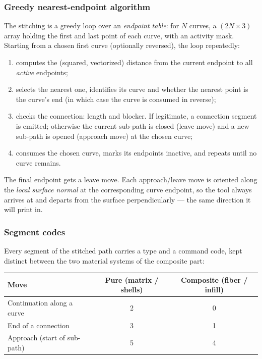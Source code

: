 \subsubsection{Greedy nearest-endpoint algorithm}

The stitching is a greedy loop over an \emph{endpoint table}: for $N$
curves, a $(2N \times 3)$ array holding the first and last point of
each curve, with an activity mask. Starting from a chosen first curve
(optionally reversed), the loop repeatedly:

\begin{enumerate}
  \item computes the (squared, vectorized) distance from the current
        endpoint to all \emph{active} endpoints;
  \item selects the nearest one, identifies its curve and whether the
        nearest point is the curve's end (in which case the curve is
        consumed in reverse);
  \item checks the connection: length and blocker. If legitimate, a
        connection segment is emitted; otherwise the current sub-path is
        closed (leave move) and a new sub-path is opened (approach
        move) at the chosen curve;
  \item consumes the chosen curve, marks its endpoints inactive, and
        repeats until no curve remains.
\end{enumerate}

The final endpoint gets a leave move. Each approach/leave move is
oriented along the \emph{local surface normal} at the corresponding
curve endpoint, so the tool always arrives at and departs from the
surface perpendicularly --- the same direction it will print in.

\subsubsection{Segment codes}

Every segment of the stitched path carries a type and a command code,
kept distinct between the two material systems of the composite part:

\begin{center}
\begin{tabular}{lcc}
\toprule
Move & Pure (matrix / shells) & Composite (fiber / infill) \\
\midrule
Continuation along a curve & 2 & 0 \\
End of a connection & 3 & 1 \\
Approach (start of sub-path) & 5 & 4 \\
\bottomrule
\end{tabular}
\end{center}

